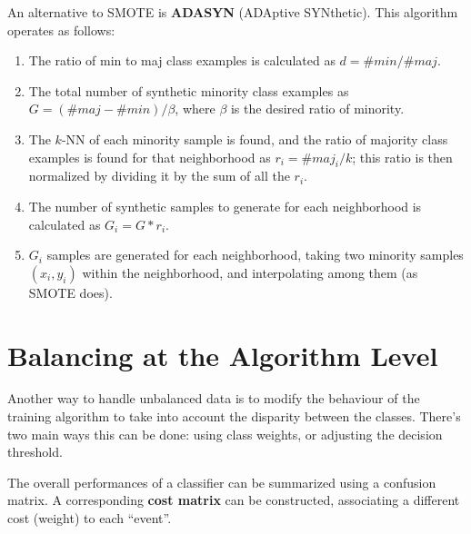 An alternative to SMOTE is \textbf{ADASYN} (ADAptive SYNthetic). This algorithm operates as follows:
\begin{enumerate}
    \item The ratio of min to maj class examples is calculated as $d = \#\textit{min}/\#\textit{maj}$.

    \item The total number of synthetic minority class examples as $G = (\#\textit{maj} - \#\textit{min}) / \beta$, where $\beta$ is the desired ratio of minority.

    \item The $k$-NN of each minority sample is found, and the ratio of majority class examples is found for that neighborhood as $r_i = \#\textit{maj}_i / k$; this ratio is then normalized by dividing it by the sum of all the $r_i$.

    \item The number of synthetic samples to generate for each neighborhood is calculated as $G_i = G*r_i$.

    \item $G_i$ samples are generated for each neighborhood, taking two minority samples $(x_i, y_i)$ within the neighborhood, and interpolating among them (as SMOTE does).
\end{enumerate}

\section{Balancing at the Algorithm Level}

Another way to handle unbalanced data is to modify the behaviour of the training algorithm to take into account the disparity between the classes. There's two main ways this can be done: using class weights, or adjusting the decision threshold.

The overall performances of a classifier can be summarized using a confusion matrix. A corresponding \textbf{cost matrix} can be constructed, associating a different cost (weight) to each ``event''.

